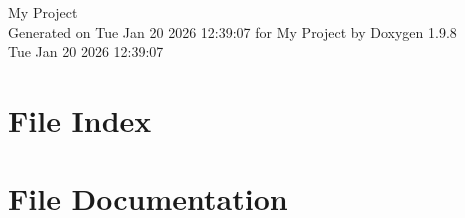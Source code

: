 \documentclass[twoside]{book}
\newcommand{\+}{\discretionary{\mbox{\scriptsize$\hookleftarrow$}}{}{}}
\newcommand{\clearemptydoublepage}{%
    \newpage{\pagestyle{empty}\cleardoublepage}%
  }
\begin{document}
  \raggedbottom
    \hypersetup{pageanchor=false,
                bookmarksnumbered=true,
                pdfencoding=unicode
               }
  \begin{titlepage}
  \vspace*{7cm}
  \begin{center}%
  {\Large My Project}\\
  \vspace*{1cm}
  {\large Generated on Tue Jan 20 2026 12\+:39\+:07 for My Project by Doxygen 1.9.8}\\
    \vspace*{0.5cm}
    {\small Tue Jan 20 2026 12:39:07}
  \end{center}
  \end{titlepage}
  \clearemptydoublepage
  \tableofcontents
  \clearemptydoublepage
  \hypersetup{pageanchor=true}

\chapter{File Index}

\chapter{File Documentation}


  \backmatter
  \newpage
  \clearemptydoublepage
  \printindex
\end{document}
